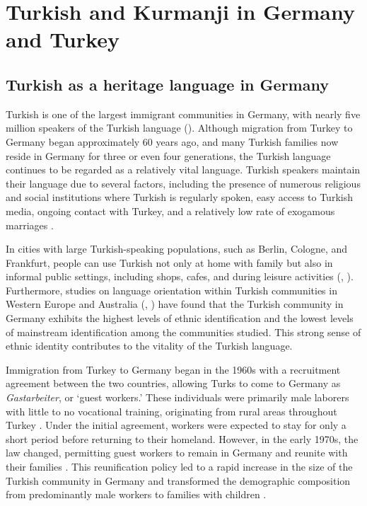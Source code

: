 \chapter{Turkish and Kurmanji in Germany and Turkey}\label{chap:key:2}
\section{Turkish as a heritage language in Germany}\label{sec:key:2.1}

Turkish is one of the largest immigrant communities in Germany, with nearly five million speakers of the Turkish language (\citealt{KaranfilŞavk2013}). Although migration from Turkey to Germany began approximately 60 years ago, and many Turkish families now reside in Germany for three or even four generations, the Turkish language continues to be regarded as a relatively vital language. Turkish speakers maintain their language due to several factors, including the presence of numerous religious and social institutions where Turkish is regularly spoken, easy access to Turkish media, ongoing contact with Turkey, and a relatively low rate of exogamous marriages \citep{Bhatia2004}.

In cities with large Turkish-speaking populations, such as Berlin, Cologne, and Frankfurt, people can use Turkish not only at home with family but also in informal public settings, including shops, cafes, and during leisure activities (\citealt{Hottmann2008}, \citealt{IefremenkoEtAl2021}). Furthermore, studies on language orientation within Turkish communities in Western Europe and Australia (\citealt{Yagmur2004}, \citealt{YagmurVanDeVijver2012}) have found that the Turkish community in Germany exhibits the highest levels of ethnic identification and the lowest levels of mainstream identification among the communities studied. This strong sense of ethnic identity contributes to the vitality of the Turkish language.

Immigration from Turkey to Germany began in the 1960s with a recruitment agreement between the two countries, allowing Turks to come to Germany as \textit{Gastarbeiter}, or `guest workers.' These individuals were primarily male laborers with little to no vocational training, originating from rural areas throughout Turkey \citep{Bayram2013}. Under the initial agreement, workers were expected to stay for only a short period before returning to their homeland. However, in the early 1970s, the law changed, permitting guest workers to remain in Germany and reunite with their families \citep{Angin2003}. This reunification policy led to a rapid increase in the size of the Turkish community in Germany and transformed the demographic composition from predominantly male workers to families with children \citep{Bayram2013}.

